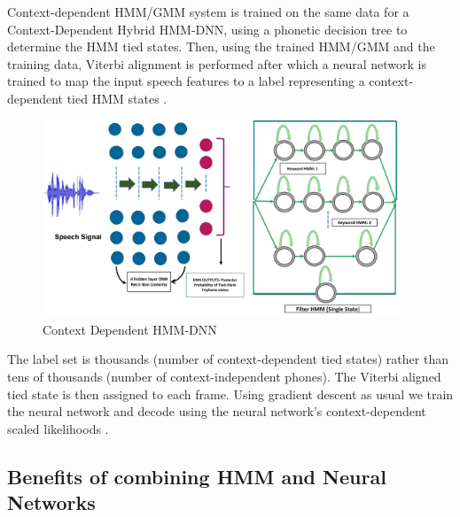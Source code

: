 Context-dependent HMM/GMM system is trained on the same data for a Context-Dependent Hybrid HMM-DNN, using a phonetic decision tree to determine the HMM tied states. Then, using the trained HMM/GMM and the training data, Viterbi alignment is performed after which a neural network is trained to map the input speech features to a label representing a context-dependent tied HMM states \cite{dahl_context-dependent_2012}. 

\begin{figure}[h]
    \centering
    \includegraphics[width=0.95\textwidth]{img/CDHMMDNN.png}
    \caption{Context Dependent HMM-DNN}
    \label{fig:CDHMMDNN}
\end{figure}

The label set is thousands (number of context-dependent tied states) rather than tens of thousands (number of context-independent phones). The Viterbi aligned tied state is then assigned to each frame. Using gradient descent as usual we  train the neural network and decode using the neural network's context-dependent scaled likelihoods \cite{seide_feature_2011}.

\subsection{Benefits of combining HMM and Neural Networks}

